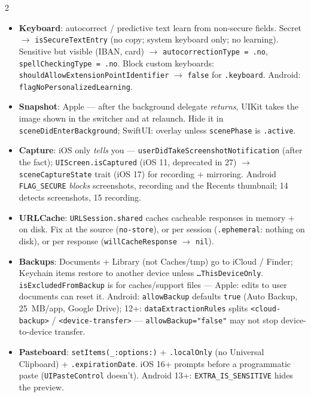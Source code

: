 \documentclass[8pt]{extarticle}
\newcommand\ct[1]{\texttt{#1}}
\newcommand\hd[1]{\par\vspace{3pt}\noindent{\bfseries\color{sheetBlue}#1}\par\vspace{1pt}}
\begin{document}
\begin{multicols}{2}
\raggedright{}

\hd{The mechanisms}
\begin{itemize}
  \item \textbf{Keyboard}: autocorrect / predictive text learn from non-secure fields. Secret
        $\to$ \ct{isSecureTextEntry} (no copy; system keyboard only; no learning\unverified).
        Sensitive but visible (IBAN, card) $\to$ \ct{autocorrectionType = .no},
        \ct{spellCheckingType = .no}. Block custom keyboards:
        \ct{shouldAllowExtensionPointIdentifier} $\to$ \ct{false} for \ct{.keyboard}.
        Android: \ct{flagNoPersonalizedLearning}.
  \item \textbf{Snapshot}: Apple — after the background delegate \emph{returns}, UIKit takes the
        image shown in the switcher and at relaunch. Hide it in \ct{sceneDidEnterBackground};
        SwiftUI: overlay unless \ct{scenePhase} is \ct{.active}.
  \item \textbf{Capture}: iOS only \emph{tells} you — \ct{userDidTakeScreenshotNotification}
        (after the fact); \ct{UIScreen.isCaptured} (iOS 11, deprecated in 27) $\to$
        \ct{sceneCaptureState} trait (iOS 17) for recording + mirroring. Android \ct{FLAG\_SECURE} \emph{blocks} screenshots,
        recording and the Recents thumbnail; 14 detects screenshots, 15 recording.
  \item \textbf{URLCache}: \ct{URLSession.shared} caches cacheable responses in memory + on disk.
        Fix at the source (\ct{no-store}), or per session (\ct{.ephemeral}: nothing on disk), or
        per response (\ct{willCacheResponse} $\to$ \ct{nil}).
  \item \textbf{Backups}: Documents + Library (not Caches/tmp) go to iCloud / Finder;
        Keychain items restore to another device unless \ct{…ThisDeviceOnly}.
        \ct{isExcludedFromBackup} is for caches/support files — Apple: edits to user documents
        can reset it. Android: \ct{allowBackup} defaults \ct{true} (Auto Backup, 25~MB/app, Google
        Drive); 12+: \ct{dataExtractionRules} splits \ct{<cloud-backup>} / \ct{<device-transfer>}
        — \ct{allowBackup="false"} may not stop device-to-device transfer.
  \item \textbf{Pasteboard}: \ct{setItems(\_:options:)} + \ct{.localOnly} (no Universal
        Clipboard) + \ct{.expirationDate}. iOS 16+ prompts before a programmatic paste
        (\ct{UIPasteControl} doesn't). Android 13+: \ct{EXTRA\_IS\_SENSITIVE} hides the preview.
\end{itemize}


\end{multicols}
\end{document}
